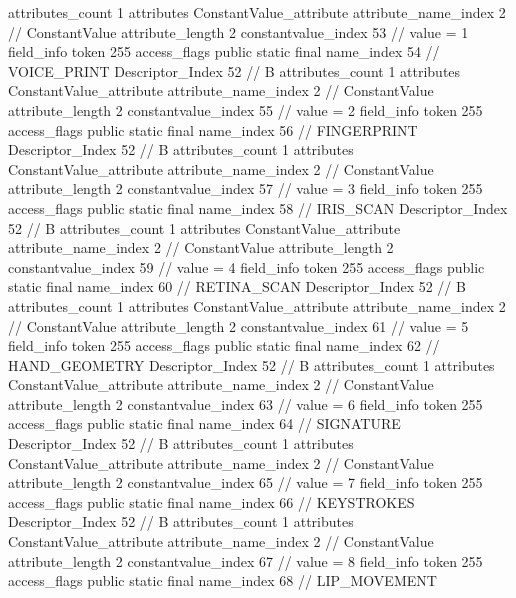 {{{{{				attributes_count	1
				attributes {
				ConstantValue_attribute {
					attribute_name_index	2		// ConstantValue
					attribute_length	2
					constantvalue_index	53		// value = 1
				}
				}
			}
			field_info {
				token	255
				access_flags	public static final
				name_index	54		// VOICE_PRINT
				Descriptor_Index	52		// B
				attributes_count	1
				attributes {
				ConstantValue_attribute {
					attribute_name_index	2		// ConstantValue
					attribute_length	2
					constantvalue_index	55		// value = 2
				}
				}
			}
			field_info {
				token	255
				access_flags	public static final
				name_index	56		// FINGERPRINT
				Descriptor_Index	52		// B
				attributes_count	1
				attributes {
				ConstantValue_attribute {
					attribute_name_index	2		// ConstantValue
					attribute_length	2
					constantvalue_index	57		// value = 3
				}
				}
			}
			field_info {
				token	255
				access_flags	public static final
				name_index	58		// IRIS_SCAN
				Descriptor_Index	52		// B
				attributes_count	1
				attributes {
				ConstantValue_attribute {
					attribute_name_index	2		// ConstantValue
					attribute_length	2
					constantvalue_index	59		// value = 4
				}
				}
			}
			field_info {
				token	255
				access_flags	public static final
				name_index	60		// RETINA_SCAN
				Descriptor_Index	52		// B
				attributes_count	1
				attributes {
				ConstantValue_attribute {
					attribute_name_index	2		// ConstantValue
					attribute_length	2
					constantvalue_index	61		// value = 5
				}
				}
			}
			field_info {
				token	255
				access_flags	public static final
				name_index	62		// HAND_GEOMETRY
				Descriptor_Index	52		// B
				attributes_count	1
				attributes {
				ConstantValue_attribute {
					attribute_name_index	2		// ConstantValue
					attribute_length	2
					constantvalue_index	63		// value = 6
				}
				}
			}
			field_info {
				token	255
				access_flags	public static final
				name_index	64		// SIGNATURE
				Descriptor_Index	52		// B
				attributes_count	1
				attributes {
				ConstantValue_attribute {
					attribute_name_index	2		// ConstantValue
					attribute_length	2
					constantvalue_index	65		// value = 7
				}
				}
			}
			field_info {
				token	255
				access_flags	public static final
				name_index	66		// KEYSTROKES
				Descriptor_Index	52		// B
				attributes_count	1
				attributes {
				ConstantValue_attribute {
					attribute_name_index	2		// ConstantValue
					attribute_length	2
					constantvalue_index	67		// value = 8
				}
				}
			}
			field_info {
				token	255
				access_flags	public static final
				name_index	68		// LIP_MOVEMENT
}}}}}
